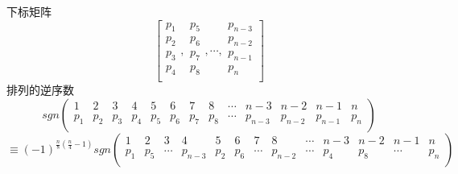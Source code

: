 \documentclass{amsc}          %
\numberwithin{equation}{section} %
\begin{document}
\begin{lemma}\label{14}
下标矩阵$$\left[
  \begin{array}{ccc}   %
    p_{1} \\  %
    p_{2} \\  %
    p_{3}\\
    p_{4}\\
  \end{array},              %
  \begin{array}{ccc}   %
    p_{5} \\  %
    p_{6} \\  %
    p_{7}\\
    p_{8}\\
  \end{array},
\cdots ,           %
  \begin{array}{ccc}   %
    p_{n-3} \\  %
    p_{n-2} \\  %
    p_{n-1}\\
    p_{n}\\
  \end{array}
\right]$$
排列的逆序数
$$sgn\left(
\begin{array}{ccccccccccccc}   %
1 & 2 & 3 & 4 & 5 & 6 & 7 & 8  &\cdots & n-3 & n-2 & n-1 & n\\  %
p_{1} & p_{2} & p_{3} & p_{4} & p_{5} & p_{6} & p_{7} & p_{8} &\cdots & p_{n-3} & p_{n-2} & p_{n-1} & p_{n}\\  %
\end{array}
\right)$$
$$\equiv(-1)^{\frac{n}{8}(\frac{n}{4}-1)}sgn\left(
\begin{array}{ccccccccccccc}   %
1 & 2 & 3 & 4 & 5 & 6 & 7 & 8  &\cdots & n-3 & n-2 & n-1 & n\\  %
p_{1} & p_{5} &\cdots & p_{n-3} & p_{2} & p_{6} &\cdots & p_{n-2} &\cdots & p_{4} & p_{8} &\cdots & p_{n}\\  %
\end{array}
\right)$$

\end{lemma}
\end{document}

